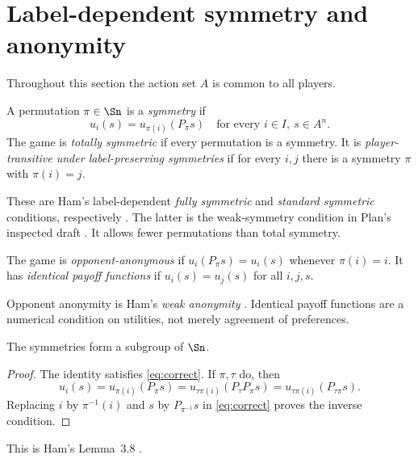 \section{Label-dependent symmetry and anonymity}
Throughout this section the action set $A$ is common to all players.
\begin{definition}
A permutation $\pi\in\Sn$ is a \emph{symmetry} if
\begin{equation}\label{eq:correct}
 u_i(s)=u_{\pi(i)}(P_\pi s)\quad\text{for every }i\in I,\ s\in A^n.
\end{equation}
The game is \emph{totally symmetric} if every permutation is a symmetry.
It is \emph{player-transitive under label-preserving symmetries} if for every
$i,j$ there is a symmetry $\pi$ with $\pi(i)=j$.
\end{definition}
These are Ham's label-dependent \emph{fully symmetric} and \emph{standard
symmetric} conditions, respectively \citep[Definitions~3.15, 3.17]{ham2021}.
The latter is the weak-symmetry condition in Plan's inspected draft
\citep[Section~2]{plan2017}. It allows fewer permutations than total symmetry.

\begin{definition}
The game is \emph{opponent-anonymous} if
$u_i(P_\pi s)=u_i(s)$ whenever $\pi(i)=i$.
It has \emph{identical payoff functions} if $u_i(s)=u_j(s)$ for all $i,j,s$.
\end{definition}
Opponent anonymity is Ham's \emph{weak anonymity}
\citep[Definition~3.9]{ham2021}. Identical payoff functions are a numerical
condition on utilities, not merely agreement of preferences.

\begin{lemma}\label{lem:group}
The symmetries form a subgroup of $\Sn$.
\end{lemma}
\begin{proof}
The identity satisfies \eqref{eq:correct}. If $\pi,\tau$ do, then
\[
u_i(s)=u_{\pi(i)}(P_\pi s)
       =u_{\tau\pi(i)}(P_\tau P_\pi s)
       =u_{\tau\pi(i)}(P_{\tau\pi}s).
\]
Replacing $i$ by $\pi^{-1}(i)$ and $s$ by $P_{\pi^{-1}}s$ in
\eqref{eq:correct} proves the inverse condition.
\end{proof}
This is Ham's Lemma~3.8 \citep{ham2021}.
